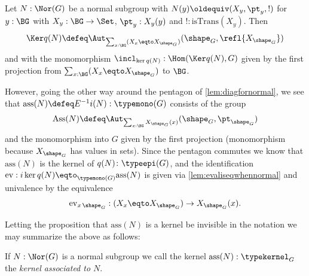 Let $N:\Nor(G)$ be a normal subgroup with $N(y)\oldequiv (X_y,\pt_y,!)$ for $y:\BG$ with $X_y:\BG\to\Set$, $\pt_y:X_y(y)$ and $!:\mathrm{isTrans}(X_y)$.
Then
$$\Ker q(N)\defeq\Aut_{\sum_{x:\BG}(X_x\eqto X_{\sh_G})}(\sh_G,\refl{X_{\sh_G}})
$$
and with the monomorphism $\incl_{\ker q(N)}:\Hom(\Ker q(N),G)$ given by the first projection from $\sum_{x:\BG}(X_x\eqto X_{\sh_G})$ to $\BG$.

However, going the other way around the pentagon of \cref{lem:diagfornormal}, we see that $\mathrm{ass}(N)\defeq E^{-1}i(N):\typemono(G)$ consists of the group
$$\mathrm{Ass}(N)\defeq\Aut_{\sum_{x:\BG}X_{\sh_G}(x)}(\sh_G,\pt_{\sh_G})
$$
and the monomorphism into $G$ given by the first projection (monomorphism because $X_{\sh_G}$ has values in sets).  Since the pentagon commutes we know that $\mathrm{ass}(N)$ is the kernel of $q(N)\colon\typeepi(G)$, and the identification $\mathrm{ev}:i\ker q(N)\eqto _{\typemono(G)}\mathrm{ass}(N)$ is given via \cref{lem:evaliseqwhennormal} and univalence by the equivalence
$$\mathrm{ev}_{x\,\sh_G}:(X_x\eqto X_{\sh_G})\to X_{\sh_G}(x)%
.$$



Letting the proposition that $\mathrm{ass}(N)$ is a kernel be invisible in the notation we may summarize the above as follows:

\begin{definition}
  \label{def:associatednormal}
  If $N:\Nor(G)$ is a normal subgroup we call the kernel $\mathrm{ass}(N):\typekernel_G$ the \emph{kernel associated to $N$}.
\end{definition}


